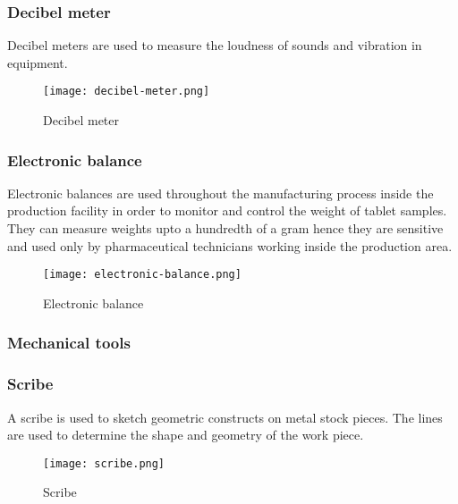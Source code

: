 \documentclass[a4paper,12pt]{article}
\begin{document}
				\subsubsection*{Decibel meter}
					Decibel meters are used to measure the loudness of sounds and vibration in equipment.\\
										 
						\begin{figure}[H]
							\centering				
							\texttt{[image: decibel-meter.png]}
							\caption{Decibel meter}
							\label{fig:decibel-meter}
						\end{figure}
				
				\newpage		
				\subsubsection*{Electronic balance}
					Electronic balances are used throughout the manufacturing process inside the production facility in order to monitor and control the weight of tablet samples.\\
					They can measure weights upto a hundredth of a gram hence they are sensitive and used only by pharmaceutical technicians working inside the production area. 
				 
						\begin{figure}[H]
							\centering				
							\texttt{[image: electronic-balance.png]}
							\caption{Electronic balance}
							\label{fig:electronic balance}
						\end{figure}
						
			\newpage	
			\subsubsection{Mechanical tools}
				\subsubsection*{Scribe}
					A scribe is used to sketch geometric constructs on metal stock pieces.
					The lines are used to determine the shape and geometry of the work piece.
					 
						\begin{figure}[H]
							\centering				
								\texttt{[image: scribe.png]}
							
							\caption{Scribe}
							\label{fig:scribe}
						\end{figure}
						
\end{document}
